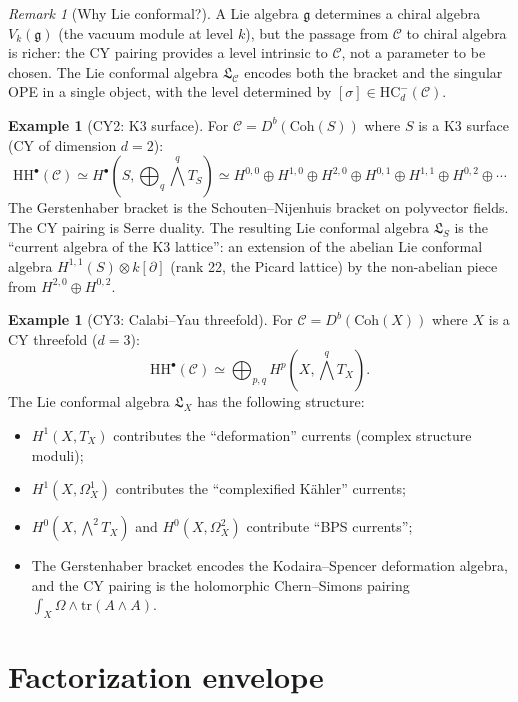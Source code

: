 \documentclass[11pt]{article}
\theoremstyle{plain}
\theoremstyle{definition}
\newtheorem{example}[theorem]{Example}
\theoremstyle{remark}
\newtheorem{remark}[theorem]{Remark}
\newcommand{\HH}{\mathrm{HH}}
\newcommand{\HC}{\mathrm{HC}}
\newcommand{\Coh}{\mathrm{Coh}}
\newcommand{\cC}{\mathcal{C}}
\newcommand{\frakg}{\mathfrak{g}}
\newcommand{\frakL}{\mathfrak{L}}
\begin{document}
\begin{remark}[Why Lie conformal?]
\label{rem:why-conformal}
A Lie algebra $\frakg$ determines a chiral algebra $V_k(\frakg)$ (the vacuum module at level $k$), but the passage from $\cC$ to chiral algebra is richer: the CY pairing provides a level intrinsic to $\cC$, not a parameter to be chosen. The Lie conformal algebra $\frakL_\cC$ encodes both the bracket and the singular OPE in a single object, with the level determined by $[\sigma] \in \HC^-_d(\cC)$.
\end{remark}

\begin{example}[CY2: K3 surface]
\label{ex:k3-step1}
For $\cC = D^b(\Coh(S))$ where $S$ is a K3 surface (CY of dimension $d=2$):
\[
\HH^\bullet(\cC) \simeq H^\bullet(S, \bigoplus_q \bigwedge^q T_S) \simeq H^{0,0} \oplus H^{1,0} \oplus H^{2,0} \oplus H^{0,1} \oplus H^{1,1} \oplus H^{0,2} \oplus \cdots
\]
The Gerstenhaber bracket is the Schouten--Nijenhuis bracket on polyvector fields. The CY pairing is Serre duality. The resulting Lie conformal algebra $\frakL_S$ is the ``current algebra of the K3 lattice'': an extension of the abelian Lie conformal algebra $H^{1,1}(S) \otimes k[\partial]$ (rank 22, the Picard lattice) by the non-abelian piece from $H^{2,0} \oplus H^{0,2}$.
\end{example}

\begin{example}[CY3: Calabi--Yau threefold]
\label{ex:cy3-step1}
For $\cC = D^b(\Coh(X))$ where $X$ is a CY threefold ($d = 3$):
\[
\HH^\bullet(\cC) \simeq \bigoplus_{p,q} H^p(X, \bigwedge^q T_X).
\]
The Lie conformal algebra $\frakL_X$ has the following structure:
\begin{itemize}
\item $H^1(X, T_X)$ contributes the ``deformation'' currents (complex structure moduli);
\item $H^1(X, \Omega^1_X)$ contributes the ``complexified K\"ahler'' currents;
\item $H^0(X, \bigwedge^2 T_X)$ and $H^0(X, \Omega^2_X)$ contribute ``BPS currents'';
\item The Gerstenhaber bracket encodes the Kodaira--Spencer deformation algebra, and the CY pairing is the holomorphic Chern--Simons pairing $\int_X \Omega \wedge \mathrm{tr}(A \wedge A)$.
\end{itemize}
\end{example}

\section{Factorization envelope}
\label{sec:step2}
\end{document}
